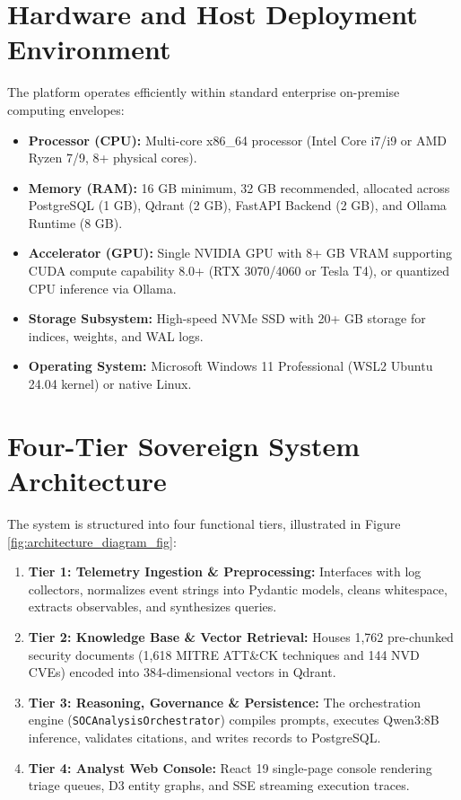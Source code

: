 \section{Hardware and Host Deployment Environment}
\label{sec:hardware_environment}
The platform operates efficiently within standard enterprise on-premise computing envelopes:
\begin{itemize}[itemsep=1pt,topsep=2pt]
  \item \textbf{Processor (CPU):} Multi-core x86\_64 processor (Intel Core i7/i9 or AMD Ryzen 7/9, 8+ physical cores).
  \item \textbf{Memory (RAM):} 16 GB minimum, 32 GB recommended, allocated across PostgreSQL (1 GB), Qdrant (2 GB), FastAPI Backend (2 GB), and Ollama Runtime (8 GB).
  \item \textbf{Accelerator (GPU):} Single NVIDIA GPU with 8+ GB VRAM supporting CUDA compute capability 8.0+ (RTX 3070/4060 or Tesla T4), or quantized CPU inference via Ollama.
  \item \textbf{Storage Subsystem:} High-speed NVMe SSD with 20+ GB storage for indices, weights, and WAL logs.
  \item \textbf{Operating System:} Microsoft Windows 11 Professional (WSL2 Ubuntu 24.04 kernel) or native Linux.
\end{itemize}

\section{Four-Tier Sovereign System Architecture}
\label{sec:tier_architecture}
The system is structured into four functional tiers, illustrated in Figure \ref{fig:architecture_diagram_fig}:
\begin{enumerate}[itemsep=1pt,topsep=2pt]
  \item \textbf{Tier 1: Telemetry Ingestion \& Preprocessing:} Interfaces with log collectors, normalizes event strings into Pydantic models, cleans whitespace, extracts observables, and synthesizes queries.
  \item \textbf{Tier 2: Knowledge Base \& Vector Retrieval:} Houses 1,762 pre-chunked security documents (1,618 MITRE ATT\&CK techniques and 144 NVD CVEs) encoded into 384-dimensional vectors in Qdrant.
  \item \textbf{Tier 3: Reasoning, Governance \& Persistence:} The orchestration engine (\texttt{SOCAnalysisOrchestrator}) compiles prompts, executes Qwen3:8B inference, validates citations, and writes records to PostgreSQL.
  \item \textbf{Tier 4: Analyst Web Console:} React 19 single-page console rendering triage queues, D3 entity graphs, and SSE streaming execution traces.
\end{enumerate}

